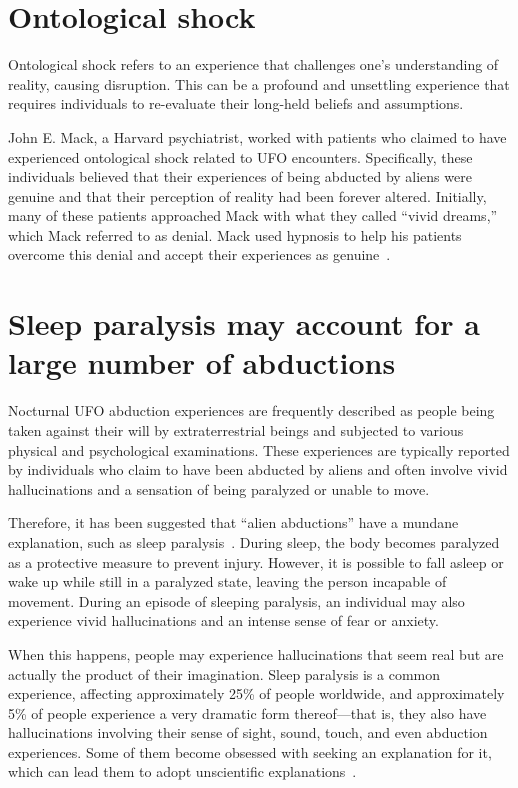 \section{Ontological shock}
\label{2023-UFO-part-Perception-abductions-Ontologicalshock}

Ontological shock refers to an experience that challenges one's understanding of reality, causing disruption. This can be a profound and unsettling experience that requires individuals to re-evaluate their long-held beliefs and assumptions.

John E. Mack, a Harvard psychiatrist, worked with patients who claimed to have experienced ontological shock related to UFO encounters. Specifically, these individuals believed that their experiences of being abducted by aliens were genuine and that their perception of reality had been forever altered. Initially, many of these patients approached Mack with what they called ``vivid dreams,'' which Mack referred to as denial. Mack used hypnosis to help his patients overcome this denial and accept their experiences as genuine~\cite{Mack1994Apr,Mack-NYT1994Mar}.


\section{Sleep paralysis may account for a large number of abductions}

Nocturnal UFO abduction experiences are frequently described as people being taken against their will by extraterrestrial beings and subjected to various physical and psychological examinations. These experiences are typically reported by individuals who claim to have been abducted by aliens and often involve vivid hallucinations and a sensation of being paralyzed or unable to move.

Therefore, it has been suggested that ``alien abductions'' have a mundane explanation, such as sleep paralysis~\cite{Holden_2002,Clancy2007Apr,Hufford2015May}. During sleep, the body becomes paralyzed as a protective measure to prevent injury. However, it is possible to fall asleep or wake up while still in a paralyzed state, leaving the person incapable of movement. During an episode of sleeping paralysis, an individual may also experience vivid hallucinations and an intense sense of fear or anxiety.

When this happens, people may experience hallucinations that seem real but are actually the product of their imagination. Sleep paralysis is a common experience, affecting approximately 25{\%}
of people worldwide, and approximately 5{\%}
of people experience a very dramatic form thereof---that is, they also have hallucinations involving their sense of sight, sound, touch, and even abduction experiences. Some of them become obsessed with seeking an explanation for it, which can lead them to adopt unscientific explanations~\cite{Spanos_1993}.

